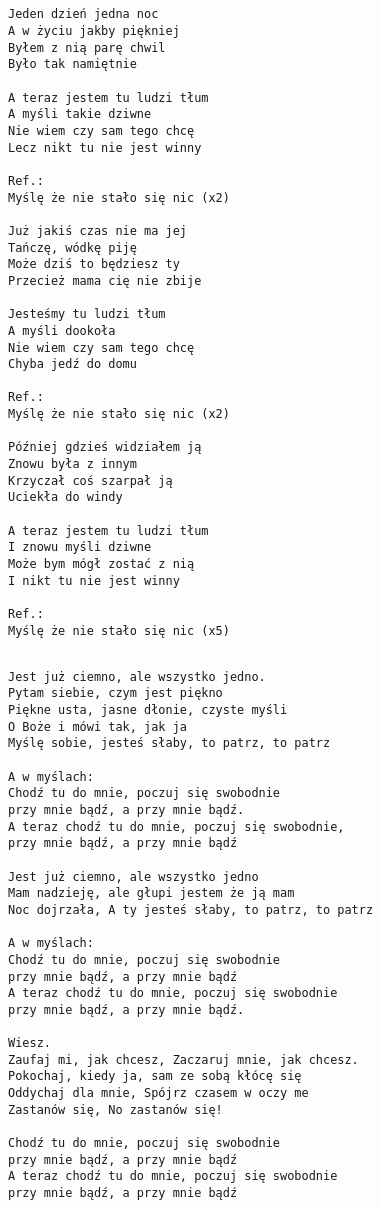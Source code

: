 \documentclass[12pt]{article}
\begin{document}
\subsection*{}
\begin{verbatim}
Jeden dzień jedna noc
A w życiu jakby piękniej
Byłem z nią parę chwil
Było tak namiętnie

A teraz jestem tu ludzi tłum
A myśli takie dziwne
Nie wiem czy sam tego chcę
Lecz nikt tu nie jest winny

Ref.:
Myślę że nie stało się nic (x2)

Już jakiś czas nie ma jej
Tańczę, wódkę piję
Może dziś to będziesz ty
Przecież mama cię nie zbije

Jesteśmy tu ludzi tłum
A myśli dookoła
Nie wiem czy sam tego chcę
Chyba jedź do domu

Ref.:
Myślę że nie stało się nic (x2)

Później gdzieś widziałem ją
Znowu była z innym
Krzyczał coś szarpał ją
Uciekła do windy

A teraz jestem tu ludzi tłum
I znowu myśli dziwne
Może bym mógł zostać z nią
I nikt tu nie jest winny

Ref.:
Myślę że nie stało się nic (x5)
\end{verbatim}
\clearpage

\subsection*{}
\begin{verbatim}
Jest już ciemno, ale wszystko jedno.
Pytam siebie, czym jest piękno
Piękne usta, jasne dłonie, czyste myśli
O Boże i mówi tak, jak ja
Myślę sobie, jesteś słaby, to patrz, to patrz

A w myślach:
Chodź tu do mnie, poczuj się swobodnie
przy mnie bądź, a przy mnie bądź.
A teraz chodź tu do mnie, poczuj się swobodnie,
przy mnie bądź, a przy mnie bądź

Jest już ciemno, ale wszystko jedno
Mam nadzieję, ale głupi jestem że ją mam
Noc dojrzała, A ty jesteś słaby, to patrz, to patrz

A w myślach:
Chodź tu do mnie, poczuj się swobodnie
przy mnie bądź, a przy mnie bądź
A teraz chodź tu do mnie, poczuj się swobodnie
przy mnie bądź, a przy mnie bądź.

Wiesz.
Zaufaj mi, jak chcesz, Zaczaruj mnie, jak chcesz.
Pokochaj, kiedy ja, sam ze sobą kłócę się
Oddychaj dla mnie, Spójrz czasem w oczy me
Zastanów się, No zastanów się!

Chodź tu do mnie, poczuj się swobodnie
przy mnie bądź, a przy mnie bądź
A teraz chodź tu do mnie, poczuj się swobodnie
przy mnie bądź, a przy mnie bądź
\end{verbatim}
\clearpage
\end{document}
